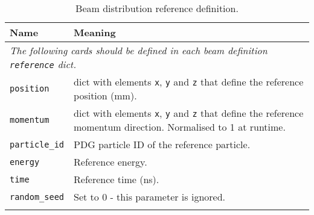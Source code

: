 \begin{table*}
\begin{center}
\caption{Beam distribution reference definition.}
\begin{tabularx}{\linewidth}{lX}
Name & Meaning \\
\hline
\multicolumn{2}{|l|}{\emph{The following cards should be defined in each beam definition \verb|reference| dict.}} \\
\hline
\verb|position| & dict with elements \verb|x|, \verb|y| and \verb|z| that define the reference position (mm).\\
\verb|momentum| & dict with elements \verb|x|, \verb|y| and \verb|z| that define the reference momentum direction. Normalised to 1 at runtime.\\
\verb|particle_id| & PDG particle ID of the reference particle.\\
\verb|energy| & Reference energy. \\
\verb|time| & Reference time (ns). \\
\verb|random_seed| & Set to 0 - this parameter is ignored.\\
\begin{makeimage} 
\end{makeimage} 
\end{tabularx}
\end{center}
\end{table*}

